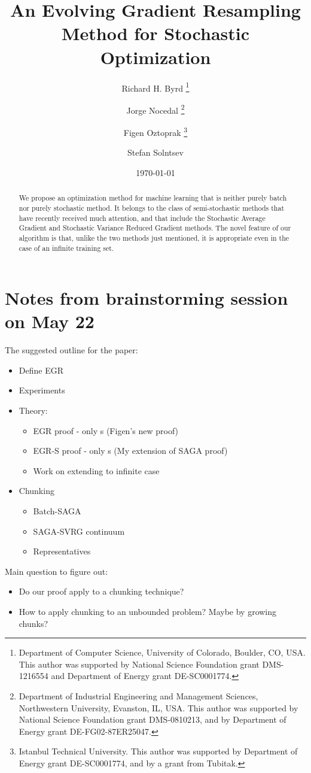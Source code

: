 \documentclass[11pt]{article}
\title{An Evolving Gradient Resampling Method for Stochastic Optimization}
\author{Richard H. Byrd 
\thanks{Department of Computer Science, University of Colorado, Boulder, CO, USA. This author was supported by National Science Foundation grant DMS-1216554 and Department of Energy grant DE-SC0001774.} 
\and Jorge Nocedal 
\thanks{Department of Industrial Engineering and Management Sciences, Northwestern University, Evanston, IL, USA. This author was supported by National Science Foundation grant DMS-0810213, and by Department of Energy grant DE-FG02-87ER25047.} 
\and Figen Oztoprak 
\thanks{Istanbul Technical University. This author was supported by Department of Energy grant DE-SC0001774, and by a grant from Tubitak.} 
\and Stefan Solntsev }
\date{\today}
\begin{document}
\maketitle 
\begin{abstract}
	We propose an optimization method for machine learning that is neither purely batch nor purely stochastic method. It belongs to the class of semi-stochastic methods that have recently received much attention, and that include the Stochastic Average Gradient and Stochastic Variance Reduced Gradient methods. The novel feature of our algorithm is that, unlike the two methods just mentioned, it is appropriate even in the case of an infinite training set. 
\end{abstract}
\newpage 
\section{Notes from brainstorming session on May 22}

The suggested outline for the paper:
\begin{itemize}
	\item Define EGR
	\item Experiments
	\item Theory: 
	      \begin{itemize}
	\item EGR proof - only s (Figen's new proof)
	\item EGR-S proof - only s (My extension of SAGA proof)
	\item Work on extending to infinite case
	      \end{itemize}
		  \item Chunking
		  \begin{itemize}
		  	\item Batch-SAGA
		  	\item SAGA-SVRG continuum
		  	\item Representatives
		  \end{itemize}
\end{itemize}

Main question to figure out: 
\begin{itemize}
	\item Do our proof apply to a chunking technique?
	\item How to apply chunking to an unbounded problem? Maybe by growing chunks?
\end{itemize}
\end{document}
